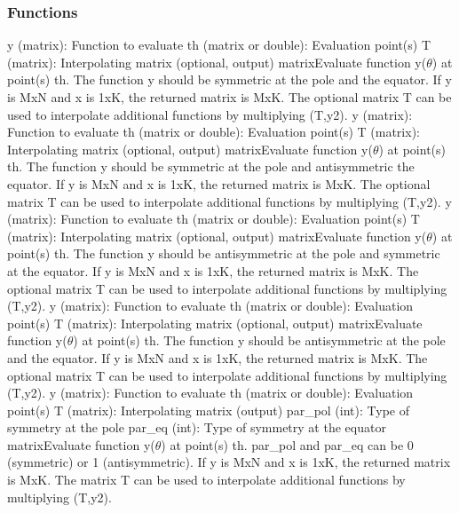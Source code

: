 \subsubsection{Functions}
{y (matrix): Function to evaluate\newline
th (matrix or double): Evaluation point(s)\newline
T (matrix): Interpolating matrix (optional, output) \newline
}{matrix}{Evaluate function y($\theta$) at point(s) th. 
The function y should be symmetric at the pole and the equator.
If y is MxN and x is 1xK, the returned matrix is MxK.
The optional matrix T can be used to interpolate additional functions by multiplying (T,y2).} 
{y (matrix): Function to evaluate\newline
th (matrix or double): Evaluation point(s)\newline
T (matrix): Interpolating matrix (optional, output) \newline
}{matrix}{Evaluate function y($\theta$) at point(s) th. 
The function y should be symmetric at the pole and antisymmetric the equator.
If y is MxN and x is 1xK, the returned matrix is MxK.
The optional matrix T can be used to interpolate additional functions by multiplying (T,y2).} 
{y (matrix): Function to evaluate\newline
th (matrix or double): Evaluation point(s)\newline
T (matrix): Interpolating matrix (optional, output) \newline
}{matrix}{Evaluate function y($\theta$) at point(s) th. 
The function y should be antisymmetric at the pole and symmetric at the equator.
If y is MxN and x is 1xK, the returned matrix is MxK.
The optional matrix T can be used to interpolate additional functions by multiplying (T,y2).} 
{y (matrix): Function to evaluate\newline
th (matrix or double): Evaluation point(s)\newline
T (matrix): Interpolating matrix (optional, output) \newline
}{matrix}{Evaluate function y($\theta$) at point(s) th. 
The function y should be antisymmetric at the pole and the equator.
If y is MxN and x is 1xK, the returned matrix is MxK.
The optional matrix T can be used to interpolate additional functions by multiplying (T,y2).} 
{y (matrix): Function to evaluate\newline
th (matrix or double): Evaluation point(s)\newline
T (matrix): Interpolating matrix (output) \newline
par\_pol (int): Type of symmetry at the pole \newline
par\_eq (int): Type of symmetry at the equator
}{matrix}{Evaluate function y($\theta$) at point(s) th. 
par\_pol and par\_eq can be 0 (symmetric) or 1 (antisymmetric).
If y is MxN and x is 1xK, the returned matrix is MxK.
The matrix T can be used to interpolate additional functions by multiplying (T,y2).} 
\funcrefend

